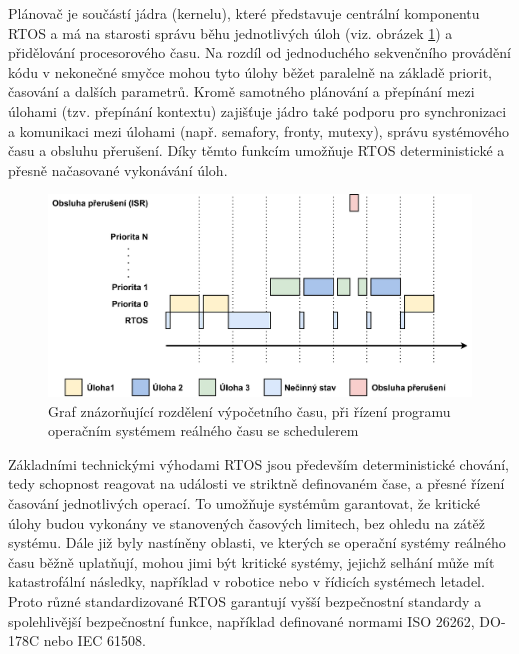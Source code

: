 Plánovač je součástí jádra (kernelu), které představuje centrální komponentu RTOS a má na starosti správu běhu jednotlivých úloh (viz. obrázek \ref{fig:rtos-scheduling}) a přidělování procesorového času. Na rozdíl od jednoduchého sekvenčního provádění kódu v nekonečné smyčce mohou tyto úlohy běžet paralelně na základě priorit, časování a dalších parametrů. Kromě samotného plánování a přepínání mezi úlohami (tzv. přepínání kontextu) zajišťuje jádro také podporu pro synchronizaci a komunikaci mezi úlohami (např. semafory, fronty, mutexy), správu systémového času a obsluhu přerušení. Díky těmto funkcím umožňuje RTOS deterministické a přesně načasované vykonávání úloh.

\newpage

\begin{figure}[h]
    \centering
    \includegraphics[width=1.00\textwidth]{obrazky-figures/rtos_scheduling.pdf}
    
    \caption{Graf znázorňující rozdělení výpočetního času, při řízení programu operačním systémem reálného času se schedulerem}
    \label{fig:rtos-scheduling}
\end{figure}

Základními technickými výhodami RTOS jsou především deterministické chování, tedy schopnost reagovat na události ve striktně definovaném čase, a přesné řízení časování jednotlivých operací. To umožňuje systémům garantovat, že kritické úlohy budou vykonány ve stanovených časových limitech, bez ohledu na zátěž systému. Dále již byly nastíněny oblasti, ve kterých se operační systémy reálného času běžně uplatňují, mohou jimi být kritické systémy, jejichž selhání může mít katastrofální následky, například v robotice nebo v řídicích systémech letadel. Proto různé standardizované RTOS garantují vyšší bezpečnostní standardy a spolehlivější bezpečnostní funkce, například definované normami ISO 26262, DO-178C nebo IEC 61508.


